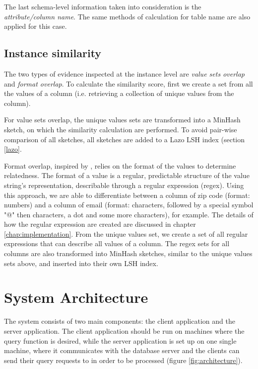 The last schema-level information taken into consideration is the \textit{attribute/column name}. The same methods of calculation for table name are also applied for this case.

\subsection{Instance similarity}

The two types of evidence inspected at the instance level are \textit{value sets overlap} and \textit{format overlap}. To calculate the similarity score, first we create a set from all the values of a column (i.e. retrieving a collection of unique values from the column).

For value sets overlap, the unique values sets are transformed into a MinHash sketch, on which the similarity calculation are performed. To avoid pair-wise comparison of all sketches, all sketches are added to a Lazo LSH index (section \ref{lazo}.

Format overlap, inspired by \cite{d3l}, relies on the format of the values to determine relatedness. The format of a value is a regular, predictable structure of the value string's representation, describable through a regular expression (regex). Using this approach, we are able to differentiate between a column of zip code (format: numbers) and a column of email (format: characters, followed by a special symbol "@" then characters, a dot and some more characters), for example. The details of how the regular expression are created are discussed in chapter \ref{chap:implementation}. From the unique values set, we create a set of all regular expressions that can describe all values of a column. The regex sets for all columns are also transformed into MinHash sketches, similar to the unique values sets above, and inserted into their own LSH index.

\section{System Architecture}\label{systemArchitecture}

The system consists of two main components: the client application and the server application. The client application should be run on machines where the query function is desired, while the server application is set up on one single machine, where it communicates with the database server and the clients can send their query requests to in order to be processed (figure \ref{fig:architecture}).

